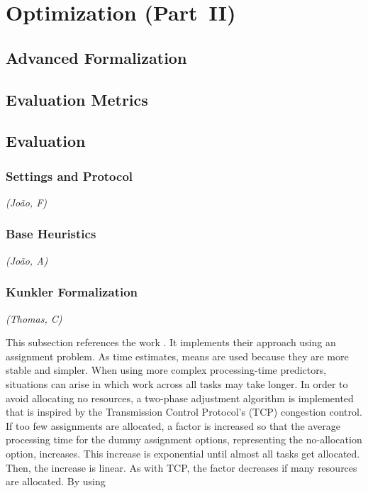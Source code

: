 \documentclass[
  english,
  font=times,
  twocolumn,
]{tumarticle}
\begin{document}


\section{Optimization (Part~II)}\label{sec:opt}




\subsection{Advanced Formalization}\label{subsec:formalization}





\subsection{Evaluation Metrics}\label{subsec:eval-metrics}



\subsection{Evaluation}\label{subsec:eval}

\subsubsection{Settings and Protocol}
\textit{(João, F)}\quad



\subsubsection{Base Heuristics}
\textit{(João, A)}\quad


\subsubsection{Kunkler Formalization}
\textit{(Thomas, C)}\quad

This subsection references the work \cite{kunklerRinderleMa}. It implements their approach using an assignment problem. As time estimates, means are used because they are more stable and simpler.
When using more complex processing-time predictors, situations can arise in which work across all tasks may take longer. In order to avoid allocating no resources, a two-phase adjustment algorithm is implemented that is inspired by the Transmission Control Protocol's (TCP) congestion control. If too few assignments are allocated, a factor is increased so that the average processing time for the dummy assignment options, representing the no-allocation option, increases. This increase is exponential until almost all tasks get allocated. Then, the increase is linear. As with TCP, the factor decreases if many resources are allocated. By using 
\end{document}
